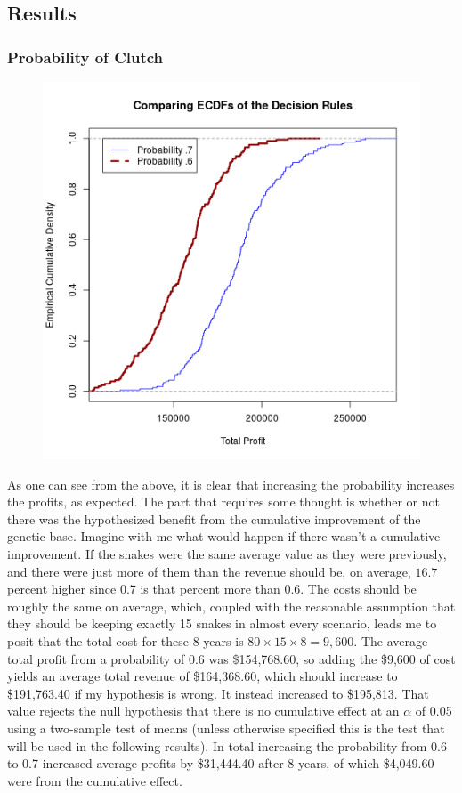 \documentclass{article}
\begin{document}
		\subsection*{Results}
		\subsubsection*{Probability of Clutch}
		\begin{figure}[H]
		\centering
		\includegraphics[width=.5\textwidth]{probECDF.png}
		\end{figure}
		\indent \indent As one can see from the above, it is clear that increasing the probability increases the profits, as expected. The part that requires some thought is whether or not there was the hypothesized benefit from the cumulative improvement of the genetic base. Imagine with me what would happen if there wasn't a cumulative improvement. If the snakes were the same average value as they were previously, and there were just more of them than the revenue should be, on average, $16.7$ percent higher since 0.7 is that percent more than 0.6. The costs should be roughly the same on average, which, coupled with the reasonable assumption that they should be keeping exactly 15 snakes in almost every scenario, leads me to posit that the total cost for these 8 years is $80\times15\times 8 = 9,600$. The average total profit from a probability of 0.6 was \$154,768.60, so adding the \$9,600 of cost yields an average total revenue of \$164,368.60, which should increase to \$191,763.40 if my hypothesis is wrong. It instead increased to \$195,813. That value rejects the null hypothesis that there is no cumulative effect at an $\alpha$ of 0.05 using a two-sample test of means (unless otherwise specified this is the test that will be used in the following results). In total increasing the probability from 0.6 to 0.7 increased average profits by \$31,444.40 after 8 years, of which \$4,049.60 were from the cumulative effect.
\end{document}
